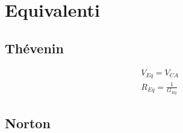 \documentclass{article}
\begin{document}
    \begin{minipage}[t]{.7\textwidth}
        
        \section*{Equivalenti}

            \begin{minipage}[t]{.5\textwidth}
                \vspace{-\baselineskip}
                
                \subsection*{Thévenin}

                    \begin{minipage}[t]{.3\textwidth}
                        \vspace{-\baselineskip}

                        

                    \end{minipage}
                    \hfill
                    \begin{minipage}[t]{.7\textwidth}

                        \begin{align*}
                            &V_{Eq} = V_{CA}\\
                            &R_{Eq} = \frac{1}{G_{Eq}}
                        \end{align*}

                    \end{minipage}

            \end{minipage}
            \hfill
            \begin{minipage}[t]{.5\textwidth}
                \vspace{-\baselineskip}
                
                \subsection*{Norton}

                    \begin{minipage}[t]{.3\textwidth}
                        \vspace{-\baselineskip}


\end{minipage}
\end{minipage}
\end{minipage}
\end{document}
